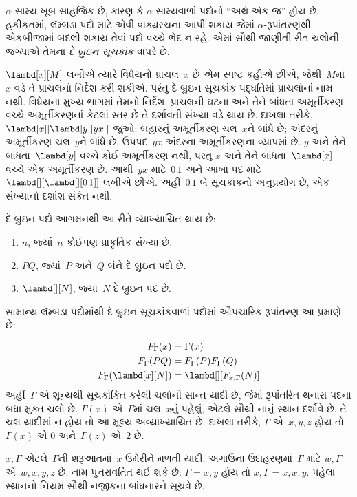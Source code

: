$\alpha$-સામ્ય ખૂબ સાહજિક છે, કારણ કે $\alpha$-સામ્યવાળાં
પદોનો ``અર્થ એક જ'' હોય છે. હકીકતમાં, લૅમ્બડા પદો માટે એવી
વાક્યરચના આપી શકાય જેમાં $\alpha$-રૂપાંતરણથી એકબીજામાં
બદલી શકાય તેવાં પદો વચ્ચે ભેદ ન રહે. એમાં સૌથી જાણીતી
રીત ચલોની જગ્યાએ તેમના \emph{દે બ્રુઇન સૂચકાંક} વાપરે છે.

$\lambd[x][M]$ લખીએ ત્યારે વિધેયનો પ્રાચલ~$x$ છે એમ
સ્પષ્ટ કહીએ છીએ, જેથી~$M$માં~$x$ વડે તે પ્રાચલનો નિર્દેશ
કરી શકીએ. પરંતુ દે બ્રુઇન સૂચકાંક પદ્ધતિમાં પ્રાચલોનાં નામ
નથી. વિધેયના મુખ્ય ભાગમાં તેમનો નિર્દેશ, પ્રાચલની ઘટના અને
તેને બાંધતા અમૂર્તીકરણ વચ્ચે અમૂર્તીકરણનાં કેટલાં સ્તર છે
તે દર્શાવતી સંખ્યા વડે થાય છે. દાખલા તરીકે,
$\lambd[x][\lambd[y][y x]]$ જુઓ: બહારનું અમૂર્તીકરણ
ચલ~$x$ને બાંધે છે; અંદરનું અમૂર્તીકરણ ચલ~$y$ને બાંધે છે.
ઉપપદ~$y x$ અંદરના અમૂર્તીકરણના વ્યાપમાં છે. $y$ અને
તેને બાંધતા~$\lambd[y]$ વચ્ચે કોઈ અમૂર્તીકરણ નથી, પરંતુ
$x$ અને તેને બાંધતા~$\lambd[x]$ વચ્ચે એક અમૂર્તીકરણ છે.
આથી~$y x$ માટે~$0\, 1$ અને આખા પદ માટે
$\lambd[][\lambd[][0\,1]]$ લખીએ છીએ. અહીં~$0\,1$ બે
સૂચકાંકનો અનુપ્રયોગ છે, એક સંખ્યાનો દશાંશ સંકેત નથી.

\begin{defn}
  દે બ્રુઇન પદો આગમનથી આ રીતે વ્યાખ્યાયિત થાય છે:
  \begin{enumerate}
  \item $n$, જ્યાં~$n$ કોઈપણ પ્રાકૃતિક સંખ્યા છે.
  \item $PQ$, જ્યાં~$P$ અને~$Q$ બંને દે બ્રુઇન પદો છે.
  \item $\lambd[][N]$, જ્યાં~$N$ દે બ્રુઇન પદ છે.
  \end{enumerate}
\end{defn}

સામાન્ય લૅમ્બડા પદોમાંથી દે બ્રુઇન સૂચકાંકવાળાં પદોમાં
ઔપચારિક રૂપાંતરણ આ પ્રમાણે છે:
\begin{defn}
  \begin{align*}
    F_\Gamma(x) &= \Gamma(x) \\
    F_\Gamma(PQ) &= F_\Gamma(P)F_\Gamma(Q) \\
    F_\Gamma(\lambd[x][N]) &= \lambd[][F_{x,\Gamma}(N)]
  \end{align*}
  અહીં~$\Gamma$ એ શૂન્યથી સૂચકાંકિત કરેલી ચલોની સાન્ત યાદી છે,
  જેમાં રૂપાંતરિત થનારા પદના બધા મુક્ત ચલો છે.
  $\Gamma(x)$ એ~$\Gamma$માં ચલ~$x$નું પહેલું, એટલે સૌથી નાનું
  સ્થાન દર્શાવે છે. તે ચલ યાદીમાં ન હોય તો આ મૂલ્ય અવ્યાખ્યાયિત છે.
  દાખલા તરીકે, $\Gamma$ એ~$x,y,z$ હોય તો~$\Gamma(x)$ એ
  $0$ અને~$\Gamma(z)$ એ~$2$ છે.

  $x,\Gamma$ એટલે~$\Gamma$ની શરૂઆતમાં~$x$ ઉમેરીને મળતી
  યાદી. અગાઉના ઉદાહરણમાં~$\Gamma$ માટે
  $w,\Gamma$ એ~$w,x,y,z$ છે.
  નામ પુનરાવર્તિત થઈ શકે છે: $\Gamma=x,y$ હોય તો
  $x,\Gamma=x,x,y$. પહેલા સ્થાનનો નિયમ સૌથી નજીકના
  બાંધનારને સૂચવે છે.
\end{defn}

